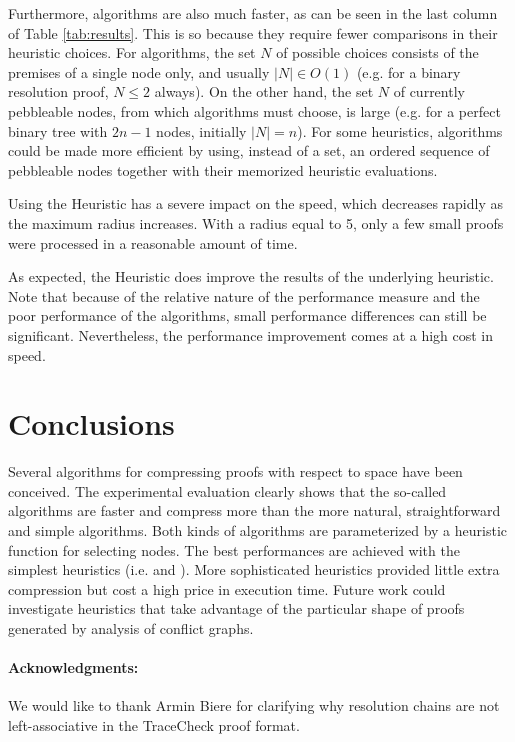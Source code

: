 \documentclass{llncs}
\begin{document}
Furthermore,  algorithms are also much faster, as can be seen in the last column of Table \ref{tab:results}. This is so because they require fewer comparisons in their heuristic choices. For  algorithms, the set $N$ of possible choices consists of the premises of a single node only, and usually $|N| \in O(1)$ (e.g. for a binary resolution proof, $N \leq 2$ always). On the other hand, the set $N$ of currently pebbleable nodes, from which  algorithms must choose, is large (e.g. for a perfect binary tree with $2n -1$ nodes, initially $|N| = n$). For some heuristics,  algorithms could be made more efficient by using, instead of a set, an ordered sequence of pebbleable nodes together with their memorized heuristic evaluations.

Using the  Heuristic has a severe impact on the speed, which decreases rapidly as the maximum radius increases. With a radius equal to 5, only a few small proofs were processed in a reasonable amount of time.

As expected, the  Heuristic does improve the results of the underlying heuristic. Note that because of the relative nature of the performance measure and the poor performance of the  algorithms, small performance differences can still be significant. Nevertheless, the performance improvement comes at a high cost in speed.

\section{Conclusions}

Several algorithms for compressing proofs with respect to space have been conceived. The experimental evaluation clearly shows that the so-called  algorithms are faster and compress more than the more natural, straightforward and simple  algorithms. Both kinds of algorithms are parameterized by a heuristic function for selecting nodes. The best performances are achieved with the simplest heuristics (i.e.  and ). More sophisticated heuristics provided little extra compression but cost a high price in execution time. Future work could investigate heuristics that take advantage of the particular shape of proofs generated by analysis of conflict graphs.

\vspace{-5pt}
\paragraph{Acknowledgments:} We would like to thank Armin Biere for clarifying why resolution chains are not left-associative in the TraceCheck proof format.

\vspace{-5pt}



\end{document}
